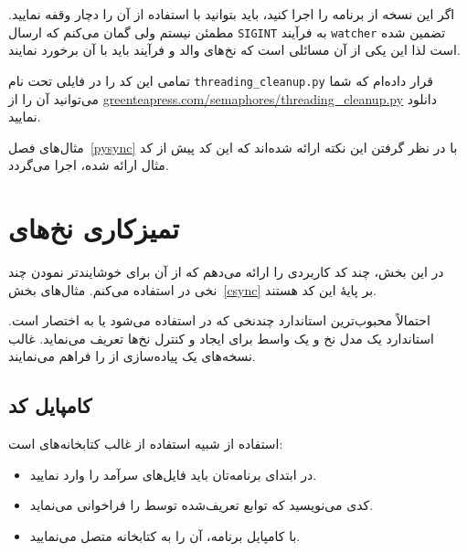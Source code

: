 \documentclass{book}
\begin{document}

    اگر این نسخه از برنامه را اجرا کنید،‌ باید بتوانید با استفاده از  آن را دچار وقفه نمایید. 
    مطمئن نیستم ولی گمان می‌کنم که  ارسال {\tt SIGINT} به فرآیند {\tt watcher} تضمین شده است لذا 
    این یکی از آن مسائلی است که نخ‌های والد و فرآیند باید با آن برخورد نمایند. 

    تمامی این کد را در فایلی تحت نام {\tt threading\_cleanup.py} قرار داده‌ام که شما می‌توانید آن را از 
    \url{greenteapress.com/semaphores/threading_cleanup.py} دانلود نمایید.  
    
    مثال‌های فصل~\ref{pysync} با در نظر گرفتن این نکته  ارائه شده‌اند که این کد پیش از کد مثال ارائه شده، اجرا می‌گردد.


\chapter{تمیزکاری نخ‌های  }
\label{ccleanup}

    در این بخش، چند کد کاربردی را ارائه می‌دهم که از آن‌ برای خوشایندتر نمودن چند نخی در  استفاده می‌کنم. 
    مثال‌های بخش~\ref{csync} بر پایهٔ این کد هستند. 

    احتمالاً محبوب‌ترین استاندارد چندنخی که در   استفاده می‌شود  یا به اختصار  است. 
    استاندارد   یک مدل نخ و یک واسط برای ایجاد و کنترل نخ‌ها تعریف می‌نماید. 
    غالب نسخه‌های   یک پیاده‌سازی از  را فراهم می‌نمایند. 

\section{کامپایل کد  }

    استفاده از    شبیه استفاده از غالب کتابخانه‌های   است: 


\begin{itemize}

\item
    در ابتدای برنامه‌تان باید فایل‌های سرآمد را وارد نمایید. 

\item
    کدی می‌نویسید که توابع تعریف‌شده توسط  را فراخوانی می‌نماید. 

\item
    با کامپایل برنامه، آن را به کتابخانه  متصل می‌نمایید. 

\end{itemize}
\end{document}
